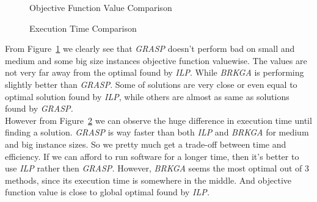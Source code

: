 \documentclass{article}
\newcommand\tab[1][1cm]{\hspace*{#1}}
\begin{document}
\begin{figure}[!htbp]
	\caption{Objective Function Value Comparison}
	\label{fig:compobjvalue}
\end{figure}

\begin{figure}[!htbp]
	\caption{Execution Time Comparison}
	\label{fig:comptime}
\end{figure}

From Figure~\ref{fig:compobjvalue} we clearly see that \textit{GRASP} doesn't perform bad on small and medium and some big size instances objective function valuewise. The values are not very far away from the optimal found by \textit{ILP}. While \textit{BRKGA} is performing slightly better than \textit{GRASP}. Some of solutions are very close or even equal to optimal solution found by \textit{ILP}, while others are almost as same as solutions found by \textit{GRASP.}\\
\tab However from Figure~\ref{fig:comptime} we can observe the huge difference in execution time until finding a solution. \textit{GRASP} is way faster than both \textit{ILP} and \textit{BRKGA} for medium and big instance sizes. So we pretty much get a trade-off between time and efficiency. If we can afford to run software for a longer time, then it's better to use \textit{ILP} rather then \textit{GRASP.} However, \textit{BRKGA} seems the most optimal out of 3 methods, since its execution time is somewhere in the middle. And objective function value is close to global optimal found by \textit{ILP.} 
\end{document}
